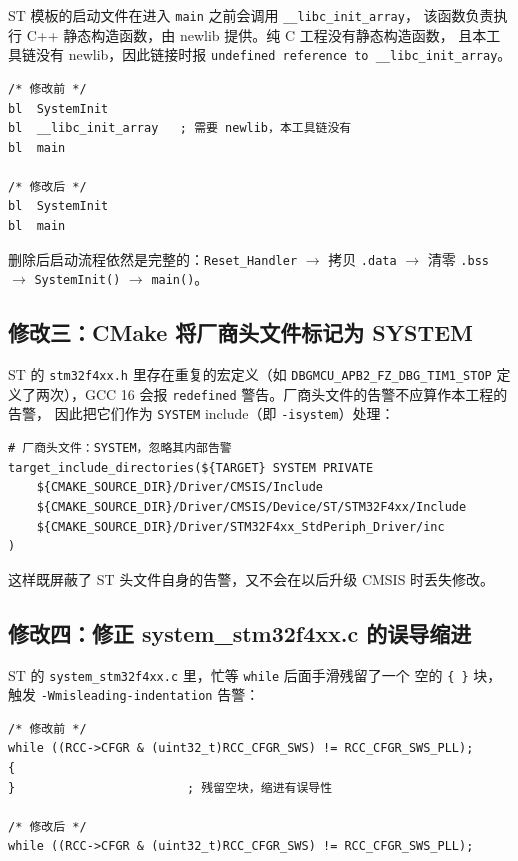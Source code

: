ST 模板的启动文件在进入 \texttt{main} 之前会调用 \texttt{\_\_libc\_init\_array}，
该函数负责执行 C++ 静态构造函数，由 newlib 提供。纯 C 工程没有静态构造函数，
且本工具链没有 newlib，因此链接时报
\texttt{undefined reference to \_\_libc\_init\_array}。

\begin{lstlisting}[style=generic]
/* 修改前 */
bl  SystemInit
bl  __libc_init_array   ; 需要 newlib，本工具链没有
bl  main

/* 修改后 */
bl  SystemInit
bl  main
\end{lstlisting}

删除后启动流程依然是完整的：\texttt{Reset\_Handler} $\to$ 拷贝 \texttt{.data}
$\to$ 清零 \texttt{.bss} $\to$ \texttt{SystemInit()} $\to$ \texttt{main()}。

\subsection{修改三：CMake 将厂商头文件标记为 SYSTEM}

ST 的 \texttt{stm32f4xx.h} 里存在重复的宏定义（如
\texttt{DBGMCU\_APB2\_FZ\_DBG\_TIM1\_STOP} 定义了两次），GCC 16 会报
\texttt{redefined} 警告。厂商头文件的告警不应算作本工程的告警，
因此把它们作为 \texttt{SYSTEM} include（即 \texttt{-isystem}）处理：

\begin{lstlisting}[style=generic]
# 厂商头文件：SYSTEM，忽略其内部告警
target_include_directories(${TARGET} SYSTEM PRIVATE
    ${CMAKE_SOURCE_DIR}/Driver/CMSIS/Include
    ${CMAKE_SOURCE_DIR}/Driver/CMSIS/Device/ST/STM32F4xx/Include
    ${CMAKE_SOURCE_DIR}/Driver/STM32F4xx_StdPeriph_Driver/inc
)
\end{lstlisting}

这样既屏蔽了 ST 头文件自身的告警，又不会在以后升级 CMSIS 时丢失修改。

\subsection{修改四：修正 system\_stm32f4xx.c 的误导缩进}

ST 的 \texttt{system\_stm32f4xx.c} 里，忙等 \texttt{while} 后面手滑残留了一个
空的 \texttt{\{ \}} 块，触发 \texttt{-Wmisleading-indentation} 告警：

\begin{lstlisting}[style=generic]
/* 修改前 */
while ((RCC->CFGR & (uint32_t)RCC_CFGR_SWS) != RCC_CFGR_SWS_PLL);
{
}                        ; 残留空块，缩进有误导性

/* 修改后 */
while ((RCC->CFGR & (uint32_t)RCC_CFGR_SWS) != RCC_CFGR_SWS_PLL);
\end{lstlisting}

